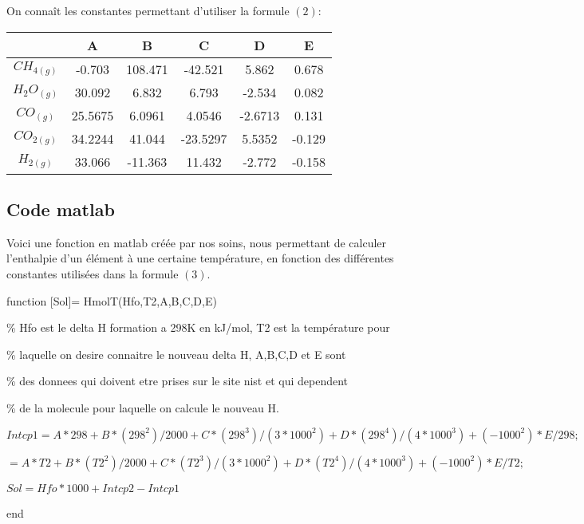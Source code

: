 \documentclass[11pt,a4paper]{report}
\begin{document}
On connaît les constantes permettant d'utiliser la formule $(2)$:

\begin{tabular}{|c|c|c|c|c|c|}
\hline 
\rule[-1ex]{0pt}{2.5ex}  & A & B & C & D & E \\ 
\hline 
\rule[-1ex]{0pt}{2.5ex} $CH_{4(g)}$ & -0.703 & 108.471 & -42.521 & 5.862 & 0.678 \\ 
\hline 
\rule[-1ex]{0pt}{2.5ex} $H_2O_{(g)}$ & 30.092 & 6.832 & 6.793 & -2.534 & 0.082 \\ 
\hline 
\rule[-1ex]{0pt}{2.5ex} $CO_{(g)}$ & 25.5675 & 6.0961 & 4.0546 & -2.6713 & 0.131 \\ 
\hline 
\rule[-1ex]{0pt}{2.5ex} $CO_{2(g)}$ & 34.2244 & 41.044 & -23.5297 & 5.5352 & -0.129 \\ 
\hline 
\rule[-1ex]{0pt}{2.5ex} $H_{2(g)}$ & 33.066 & -11.363 & 11.432 & -2.772 & -0.158 \\ 
\hline 
\end{tabular} 
\subsection*{Code matlab}
Voici une fonction en matlab créée par nos soins, nous permettant de calculer l'enthalpie d'un élément à une certaine
température, en fonction des différentes constantes utilisées dans la formule $(3)$.

function [Sol]= HmolT(Hfo,T2,A,B,C,D,E)

\% Hfo est le delta H formation a 298K en kJ/mol, T2 est la température pour

\% laquelle on desire connaitre le nouveau delta H, A,B,C,D et E sont

\% des donnees qui doivent etre prises sur le site nist et qui dependent

\% de la molecule pour laquelle on calcule le nouveau H.

$Intcp1 = A*298 + B* (298^2)/2000 + C*(298^3)/(3*1000^2) + D*(298^4)/(4*1000^3) + (-1000^2)*E/298;$

$ = A*T2 + B* (T2^2)/2000 + C*(T2^3)/(3*1000^2) + D*(T2^4)/(4*1000^3) + (-1000^2)*E/T2;$

$Sol = Hfo*1000 + Intcp2 - Intcp1$

end
\end{document}
